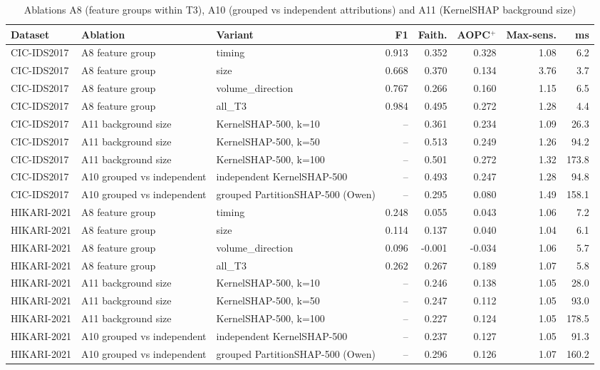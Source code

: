 \begin{table}[!htbp]
\centering
\caption{Ablations A8 (feature groups within T3), A10 (grouped vs independent attributions) and A11 (KernelSHAP background size)}
\label{tab:ablextra}
\scriptsize
\setlength{\tabcolsep}{3.5pt}
\begin{tabular}{lp{2.8cm}p{4.2cm}rrrrr}
\toprule
\textbf{Dataset} & \textbf{Ablation} & \textbf{Variant} & \textbf{F1} & \textbf{Faith.} & \textbf{AOPC$^+$} & \textbf{Max-sens.} & \textbf{ms} \\
\midrule
CIC-IDS2017 & A8 feature group & timing & 0.913 & 0.352 & 0.328 & 1.08 & 6.2 \\
CIC-IDS2017 & A8 feature group & size & 0.668 & 0.370 & 0.134 & 3.76 & 3.7 \\
CIC-IDS2017 & A8 feature group & volume\_direction & 0.767 & 0.266 & 0.160 & 1.15 & 6.5 \\
CIC-IDS2017 & A8 feature group & all\_T3 & 0.984 & 0.495 & 0.272 & 1.28 & 4.4 \\
CIC-IDS2017 & A11 background size & KernelSHAP-500, k=10 & -- & 0.361 & 0.234 & 1.09 & 26.3 \\
CIC-IDS2017 & A11 background size & KernelSHAP-500, k=50 & -- & 0.513 & 0.249 & 1.26 & 94.2 \\
CIC-IDS2017 & A11 background size & KernelSHAP-500, k=100 & -- & 0.501 & 0.272 & 1.32 & 173.8 \\
CIC-IDS2017 & A10 grouped vs independent & independent KernelSHAP-500 & -- & 0.493 & 0.247 & 1.28 & 94.8 \\
CIC-IDS2017 & A10 grouped vs independent & grouped PartitionSHAP-500 (Owen) & -- & 0.295 & 0.080 & 1.49 & 158.1 \\
HIKARI-2021 & A8 feature group & timing & 0.248 & 0.055 & 0.043 & 1.06 & 7.2 \\
HIKARI-2021 & A8 feature group & size & 0.114 & 0.137 & 0.040 & 1.04 & 6.1 \\
HIKARI-2021 & A8 feature group & volume\_direction & 0.096 & -0.001 & -0.034 & 1.06 & 5.7 \\
HIKARI-2021 & A8 feature group & all\_T3 & 0.262 & 0.267 & 0.189 & 1.07 & 5.8 \\
HIKARI-2021 & A11 background size & KernelSHAP-500, k=10 & -- & 0.246 & 0.138 & 1.05 & 28.0 \\
HIKARI-2021 & A11 background size & KernelSHAP-500, k=50 & -- & 0.247 & 0.112 & 1.05 & 93.0 \\
HIKARI-2021 & A11 background size & KernelSHAP-500, k=100 & -- & 0.227 & 0.124 & 1.05 & 178.5 \\
HIKARI-2021 & A10 grouped vs independent & independent KernelSHAP-500 & -- & 0.237 & 0.127 & 1.05 & 91.3 \\
HIKARI-2021 & A10 grouped vs independent & grouped PartitionSHAP-500 (Owen) & -- & 0.296 & 0.126 & 1.07 & 160.2 \\
\bottomrule
\end{tabular}
\end{table}
